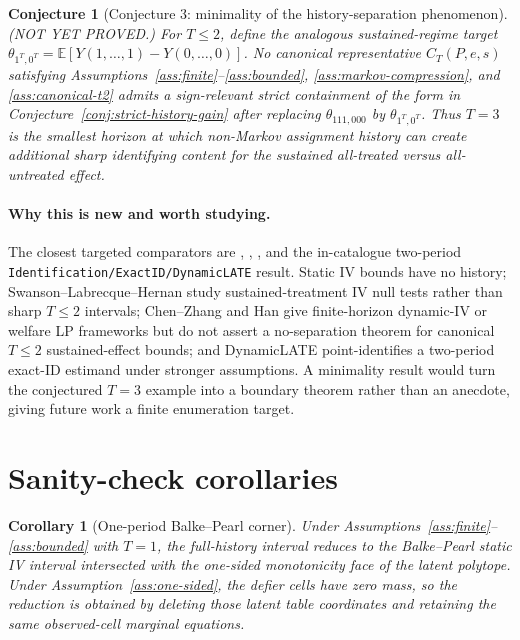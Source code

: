 \documentclass[11pt]{article}
\newcommand{\E}{\mathbb{E}}
\theoremstyle{definition}
\theoremstyle{plain}
\newtheorem{conjecture}{Conjecture}
\newtheorem{corollary}{Corollary}
\theoremstyle{remark}
\begin{document}
\begin{conjecture}[Conjecture 3: minimality of the history-separation phenomenon]\label{conj:minimality}
(NOT YET PROVED.)  For \(T\le2\), define the analogous sustained-regime target \(\theta_{1^T,0^T}=\E[Y(1,\ldots,1)-Y(0,\ldots,0)]\).  No canonical representative \(C_T(P,e,s)\) satisfying Assumptions~\ref{ass:finite}--\ref{ass:bounded}, \ref{ass:markov-compression}, and \ref{ass:canonical-t2} admits a sign-relevant strict containment of the form in Conjecture~\ref{conj:strict-history-gain} after replacing \(\theta_{111,000}\) by \(\theta_{1^T,0^T}\).  Thus \(T=3\) is the smallest horizon at which non-Markov assignment history can create additional sharp identifying content for the sustained all-treated versus all-untreated effect.
\end{conjecture}
\paragraph{Why this is new and worth studying.}
The closest targeted comparators are \citet{SwansonLabrecqueHernan2018}, \citet{ChenZhang2023}, \citet{Han2024}, and the in-catalogue two-period \texttt{Identification/ExactID/DynamicLATE} result.  Static IV bounds have no history; Swanson--Labrecque--Hernan study sustained-treatment IV null tests rather than sharp \(T\le2\) intervals; Chen--Zhang and Han give finite-horizon dynamic-IV or welfare LP frameworks but do not assert a no-separation theorem for canonical \(T\le2\) sustained-effect bounds; and DynamicLATE point-identifies a two-period exact-ID estimand under stronger assumptions.  A minimality result would turn the conjectured \(T=3\) example into a boundary theorem rather than an anecdote, giving future work a finite enumeration target.

\section{Sanity-check corollaries}
\begin{corollary}[One-period Balke--Pearl corner]\label{cor:bp-corner}
Under Assumptions~\ref{ass:finite}--\ref{ass:bounded} with \(T=1\), the full-history interval reduces to the Balke--Pearl static IV interval intersected with the one-sided monotonicity face of the latent polytope.  Under Assumption~\ref{ass:one-sided}, the defier cells have zero mass, so the reduction is obtained by deleting those latent table coordinates and retaining the same observed-cell marginal equations.
\end{corollary}
\end{document}
